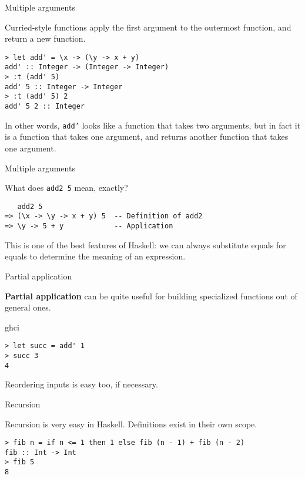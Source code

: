 %
\begin{frame}[fragile]{Multiple arguments}

Curried-style functions apply the first argument to the outermost function, and
return a new function.

\begin{block}{}
\begin{verbatim}
> let add' = \x -> (\y -> x + y)
add' :: Integer -> (Integer -> Integer)
> :t (add' 5)
add' 5 :: Integer -> Integer
> :t (add' 5) 2
add' 5 2 :: Integer
\end{verbatim}
\end{block}

In other words, \texttt{add'} looks like a function that takes two arguments,
but in fact it is a function that takes one argument, and returns another
function that takes one argument.

\end{frame}

%
\begin{frame}[fragile]{Multiple arguments}

What does \texttt{add2 5} mean, exactly?

\begin{block}{}
\begin{verbatim}
   add2 5
=> (\x -> \y -> x + y) 5  -- Definition of add2
=> \y -> 5 + y            -- Application
\end{verbatim}
\end{block}

This is one of the best features of Haskell: we can always substitute equals for
equals to determine the meaning of an expression.

\end{frame}


%
\begin{frame}[fragile]{Partial application}

\textbf{Partial application} can be quite useful for building specialized
functions out of general ones.

\begin{block}{ghci}
\begin{verbatim}
> let succ = add' 1
> succ 3
4
\end{verbatim}
\end{block}

Reordering inputs is easy too, if necessary.

\end{frame}

%
\begin{frame}[fragile]{Recursion}

Recursion is very easy in Haskell. Definitions exist in their own scope.

\begin{block}{}
\begin{verbatim}
> fib n = if n <= 1 then 1 else fib (n - 1) + fib (n - 2)
fib :: Int -> Int
> fib 5
8
\end{verbatim}
\end{block}

\end{frame}

